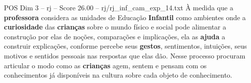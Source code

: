\begin{textsample}{POS Dim 3 – rj – Score 26.00 – rj/rj\_inf\_cam\_exp\_14.txt}
À medida que a \textbf{professora} considera as unidades de Educação \textbf{Infantil} como ambientes onde a \textbf{curiosidade} das \textbf{crianças} sobre o mundo físico e social pode alimentar a construção por elas de noções, comparações e implicações, ela as \textbf{ajuda} a construir explicações, conforme percebe seus \textbf{gestos}, sentimentos, intuições, seus motivos e sentidos pessoais nas respostas que elas dão.
Nesse processo procuram articular o modo como as \textbf{crianças} agem, sentem e pensam com os conhecimentos já disponíveis na cultura sobre cada objeto de conhecimento.

\end{textsample}
